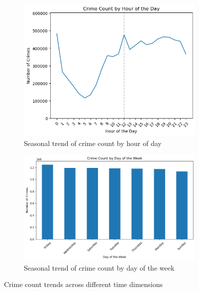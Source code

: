 \documentclass[12pt]{article}
\begin{document}
\begin{figure}[H]
\begin{subfigure}[t]{0.49\textwidth}
        \centering
        \includegraphics[width=\textwidth]{figures/crime_count_by_hour_of_day.png}
        \caption{Seasonal trend of crime count by hour of day}
        \label{fig:crime_count_by_hour_of_day}
    \end{subfigure}
    \hfill
    \begin{subfigure}[t]{0.49\textwidth}
        \centering
        \includegraphics[width=\textwidth]{figures/crime_count_by_day_of_the_week.png}
        \caption{Seasonal trend of crime count by day of the week}
        \label{fig:crime_count_by_day_of_the_week}
    \end{subfigure}
    \caption{Crime count trends across different time dimensions}
    \label{fig:crime_trends}
\end{figure}
\end{document}

